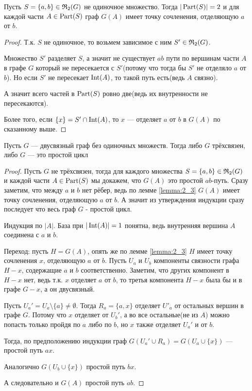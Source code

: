 \begin{lm}[Лемма 2.3] \label{lemma:2_3}
	Пусть $S = \{ a, b \} \in \mathfrak{R}_2(G)$ не одиночное множество.
	Тогда $|\operatorname{Part}(S)| = 2$ и для каждой части $A \in \operatorname{Part}(S)$ граф $G(A)$ имеет точку сочленения, отделяющую $a$ от $b$.
\end{lm}

\begin{proof}
	Т.к. $S$ не одиночное, то возьмем зависимое с ним $S' \in \mathfrak{R}_2(G)$.

	Множество $S'$ разделяет $S$, а значит не существует $ab$ пути по вершинам части $A$ в графе $G$ который не пересекается с $S'$(потому что тогда бы $S'$ не отделяло $a$ от $b$).
	Но если $S'$ не пересекает $\operatorname{Int}(A)$, то такой путь есть(ведь $A$ связно).

	А значит всего частей в $\operatorname{Part}(S)$ ровно две(ведь их внутренности не пересекаются).

	Более того, если $\{x\} = S' \cap \operatorname{Int}(A)$, то $x$ — отделяет $a$ от $b$ в $G(A)$ по сказанному выше.
	
\end{proof}

\begin{thm}[Теорема 2.1] \label{theorem:2_1}
	Пусть $G$ — двусвязный граф без одиночных множеств.
	Тогда либо $G$ трёхсвязен, либо $G$ — это простой цикл
\end{thm}

\begin{proof}
	Пусть $G$ не трёхсвязен, тогда для каждого множества $S = \{a, b \} \in \mathfrak{R}_2(G)$ и каждой части $A \in \operatorname{Part}(S)$ мы докажем, что $G(A)$ это простой $ab$-путь.
	Сразу заметим, что между $a$ и $b$ нет рёбер, ведь по лемме \ref{lemma:2_3} $G(A)$ имеет точку сочленения, отделяющую $a$ от $b$.
	А значит из утверждения индукции сразу последует что весь граф $G$ - простой цикл.

	Индукция по $|A|$.
	База при $|\operatorname{Int}(A)| = 1$ понятна, ведь внутренняя вершина $A$ соединена с $a$ и $b$.

	Переход: пусть $H = G(A)$, опять же по лемме \ref{lemma:2_3} $H$ имеет точку сочленения $x$, отделяющую $a$ от $b$.
	Пусть $U_a$ и $U_b$ компоненты связности графа $H - x$, содержащие $a$ и $b$ соответственно.
	Заметим, что других компонент в $H - x$ нет, ведь т.к. $x$ отделяет $a$ от $b$, то третья компонента $H - x$ была бы и в графе $G - x$, а он двусвязный.

	Пусть $U_a' = U_a \setminus \{a\} \neq \emptyset$.
	Тогда $R_a = \{a, x \}$ отделяет $U'_a$ от остальных вершин в графе $G$.
	Потому что $x$ отделяет от $U_b'$, а во все остальные(не из $A$) можно попасть только пройдя по $a$ либо по $b$, но $x$ также отделяет $U_a'$ и от $b$.

	Тогда, по предположению индукции граф $G(U_a' \cup R_a) = G(U_a \cup \{x\})$ — простой путь $ax$.

	Аналогично $G(U_b \cup \{x\})$ простой путь $bx$.

	А следовательно и $G(A)$ простой путь $ab$.
\end{proof}

